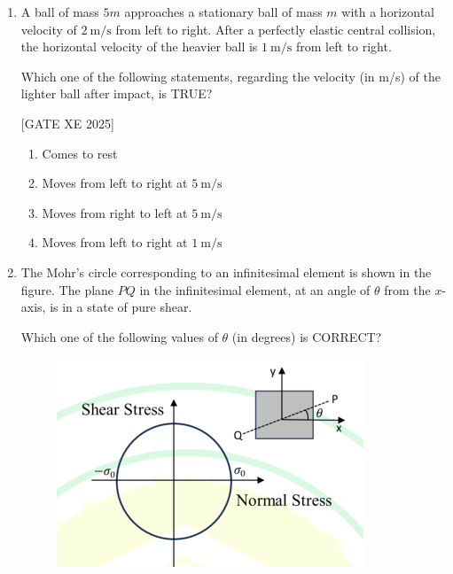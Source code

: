 \documentclass[journal,12pt,onecolumn]{IEEEtran}
\theoremstyle{remark}
\begin{document}
\begin{enumerate}
\hfill[GATE XE 2025]


\begin{multicols}{2}
\begin{enumerate}
\item $P\sin\!\big(\sqrt{k/m}\,t\big)$
\item $\dfrac{P}{2}\cos\!\big(\sqrt{k/m}\,t\big)+\dfrac{P}{2}\sin\!\big(\sqrt{k/m}\,t\big)$
\item $P\cos\!\big(\sqrt{k/m}\,t\big)$
\item $P\cos\!\big(\sqrt{k/m}\,t\big)+P\sin\!\big(\sqrt{k/m}\,t\big)$
\end{enumerate}
\end{multicols}

\item A ball of mass $5m$ approaches a stationary ball of mass $m$ with a horizontal velocity of $2~\text{m/s}$ from left to right. After a perfectly elastic central collision, the horizontal velocity of the heavier ball is $1~\text{m/s}$ from left to right.

Which one of the following statements, regarding the velocity (in m/s) of the lighter ball after impact, is TRUE?


\hfill[GATE XE 2025]


\begin{multicols}{2}
\begin{enumerate}
\item Comes to rest
\item Moves from left to right at $5~\text{m/s}$
\item Moves from right to left at $5~\text{m/s}$
\item Moves from left to right at $1~\text{m/s}$
\end{enumerate}
\end{multicols}

\item The Mohr’s circle corresponding to an infinitesimal element is shown in the figure. The plane $PQ$ in the infinitesimal element, at an angle of $\theta$ from the $x$-axis, is in a state of pure shear.

Which one of the following values of $\theta$ (in degrees) is CORRECT?
\begin{figure}[H]
    \centering
    \includegraphics[width=0.5\columnwidth]{figs/fig16.png}
    \caption{}
    \label{fig:placeholder}
\end{figure}


\end{enumerate}
\end{document}
